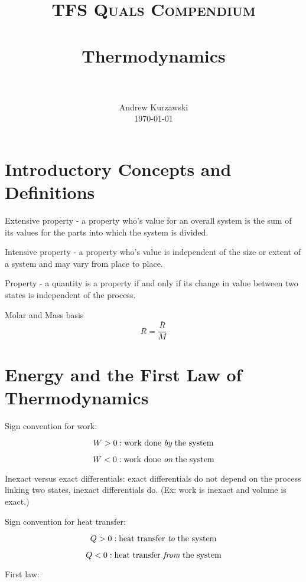 \documentclass[paper=letter, fontsize=11pt]{scrartcl}
\title{
        \usefont{OT1}{bch}{b}{n}
        \normalfont \normalsize \textsc{TFS Quals Compendium} \\ [25pt]
        \horrule{0.5pt} \\[0.4cm]
        \huge Thermodynamics \\
        \horrule{2pt} \\[0.5cm]
}
\author{
        \normalfont                                 \normalsize
        Andrew Kurzawski\\[-3pt]      \normalsize
        \today
}
\date{}
\numberwithin{equation}{section}        %
\numberwithin{figure}{section}          %
\numberwithin{table}{section}               %
\begin{document}
\maketitle


\section{Introductory Concepts and Definitions}
    
Extensive property - a property who's value for an overall system is the sum of its values for the parts into which the system is divided.

Intensive property - a property who's value is independent of the size or extent of a system and may vary from place to place.

Property - a quantity is a property if and only if its change in value between two states is independent of the process.

Molar and Mass basis
\begin{equation}
    R = \frac{\bar R}{M}
\end{equation}


\newpage
\section{Energy and the First Law of Thermodynamics}

Sign convention for work:

\begin{equation}
W > 0:\text{work done {\it by} the system}
\end{equation}

\begin{equation}
W < 0:\text{work done {\it on} the system}
\end{equation}

Inexact versus exact differentials: exact differentials do not depend on the process linking two states, inexact differentials do. (Ex: work is inexact and volume is exact.)

Sign convention for heat transfer:

\begin{equation}
Q > 0:\text{heat transfer {\it to} the system}
\end{equation}

\begin{equation}
Q < 0:\text{heat transfer {\it from} the system}
\end{equation}

First law:
\end{document}
